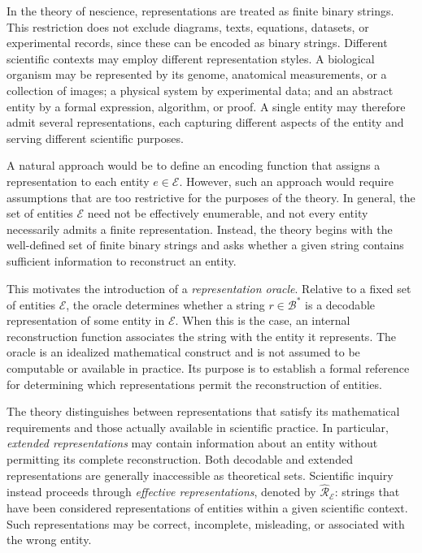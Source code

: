 In the theory of nescience, representations are treated as finite binary strings. This restriction does not exclude diagrams, texts, equations, datasets, or experimental records, since these can be encoded as binary strings. Different scientific contexts may employ different representation styles. A biological organism may be represented by its genome, anatomical measurements, or a collection of images; a physical system by experimental data; and an abstract entity by a formal expression, algorithm, or proof. A single entity may therefore admit several representations, each capturing different aspects of the entity and serving different scientific purposes.

A natural approach would be to define an encoding function that assigns a representation to each entity $e \in \mathcal{E}$. However, such an approach would require assumptions that are too restrictive for the purposes of the theory. In general, the set of entities $\mathcal{E}$ need not be effectively enumerable, and not every entity necessarily admits a finite representation. Instead, the theory begins with the well-defined set of finite binary strings and asks whether a given string contains sufficient information to reconstruct an entity.

This motivates the introduction of a \emph{representation oracle}. Relative to a fixed set of entities $\mathcal{E}$, the oracle determines whether a string $r \in \mathcal{B}^{\ast}$ is a decodable representation of some entity in $\mathcal{E}$. When this is the case, an internal reconstruction function associates the string with the entity it represents. The oracle is an idealized mathematical construct and is not assumed to be computable or available in practice. Its purpose is to establish a formal reference for determining which representations permit the reconstruction of entities.

The theory distinguishes between representations that satisfy its mathematical requirements and those actually available in scientific practice. In particular, \emph{extended representations} may contain information about an entity without permitting its complete reconstruction. Both decodable and extended representations are generally inaccessible as theoretical sets. Scientific inquiry instead proceeds through \emph{effective representations}, denoted by $\hat{\mathcal{R}}_{\mathcal{E}}$: strings that have been considered representations of entities within a given scientific context. Such representations may be correct, incomplete, misleading, or associated with the wrong entity.


